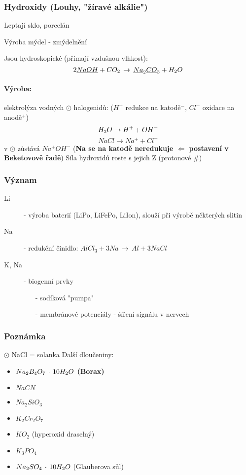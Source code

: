     \newpage
    \subsubsection{Hydroxidy (Louhy, "žíravé alkálie")}
        Leptají sklo, porcelán

        Výroba mýdel - zmýdelnění

        Jsou hydroskopické (přímají vzdušnou vlhkost):\[2\underline{NaOH} + CO_2\,\to\,\underline{Na}_2\underline{CO}_3 + H_2O \]
        \paragraph*{Výroba:}
            elektrolýza vodných $\odot$ halogenidů: ($H^+$ redukce na katodě$^-$, $Cl^-$ oxidace na anodě$^+$)
            \[H_2O \to H ^+ + OH^-\]
            \[NaCl \to Na^+ + Cl^-\]
            v $\odot$ zůstává $Na^+OH^-$ (\textbf{Na se na katodě neredukuje $\Longleftarrow $ postavení v Beketovově řadě})
            Síla hydroxidů roste s jejich Z (protonové \#)
    \subsubsection{Význam}
        \begin{description}
            \item[Li] - výroba baterií (LiPo, LiFePo, LiIon), slouží při výrobě některých slitin
            \item[Na] - redukční činidlo: \(AlCl_3 + 3Na\,\to\,Al+3NaCl\)
            \item[K, Na] - biogenní prvky \begin{itemize}
                \item[-] sodíková "pumpa"
                \item[-] membránové potenciály - šíření signálu v nervech
            \end{itemize}
        \end{description}
    \subsubsection{Poznámka}
    $\odot$ NaCl = solanka
    \newline
    \newline
    Další dloučeniny:
    \begin{itemize}
        \item \textbf{$ Na _2 B _4 O _7 \, \cdot \, 10 H_2O$ (Borax)}
        \item $NaCN$
        \item $Na_2SiO_3$
        \item $K _2 Cr _2 O _7$
        \item $K O _2$ (hyperoxid draselný)
        \item $K _3 P O _4$
        \item $Na _2 SO _4 \, \cdot \, 10 H_2O$ (Glauberova sůl)
    \end{itemize}

